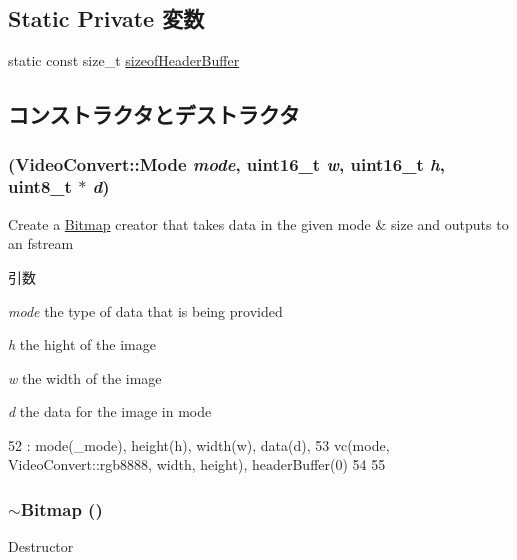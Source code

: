 \subsection*{Static Private 変数}
\begin{DoxyCompactItemize}
\item 
static const size\_\-t \hyperlink{classBitmap_aa659ac1e8f41fbbeff951253e434390f}{sizeofHeaderBuffer}
\end{DoxyCompactItemize}


\subsection{コンストラクタとデストラクタ}
\hypertarget{classBitmap_a9ff596a4368fb81b7df59656b9090f99}{
\subsubsection[{Bitmap}]{ ({\bf VideoConvert::Mode} {\em mode}, \/  uint16\_\-t {\em w}, \/  uint16\_\-t {\em h}, \/  uint8\_\-t $\ast$ {\em d})}}
\label{classBitmap_a9ff596a4368fb81b7df59656b9090f99}
Create a \hyperlink{classBitmap}{Bitmap} creator that takes data in the given mode \& size and outputs to an fstream 
\begin{DoxyParams}{引数}
\item[{\em mode}]the type of data that is being provided \item[{\em h}]the hight of the image \item[{\em w}]the width of the image \item[{\em d}]the data for the image in mode \end{DoxyParams}



\begin{DoxyCode}
52     : mode(_mode), height(h), width(w), data(d),
53     vc(mode, VideoConvert::rgb8888, width, height), headerBuffer(0)
54 {
55 }
\end{DoxyCode}
\hypertarget{classBitmap_a674e993ff780ec078ec387614ba2a230}{
\subsubsection[{$\sim$Bitmap}]{\setlength{\rightskip}{0pt plus 5cm}$\sim${\bf Bitmap} ()}}
\label{classBitmap_a674e993ff780ec078ec387614ba2a230}
Destructor 


